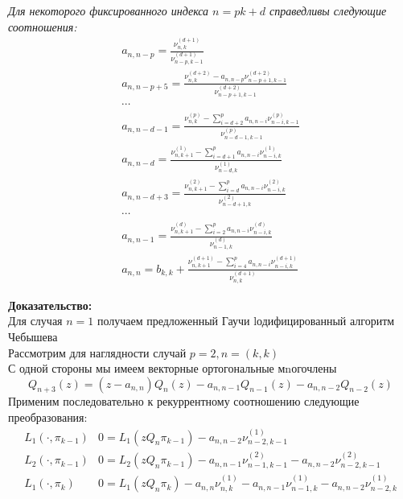 \begin{teor}
\textit{Для некоторого фиксированного индекса $n=pk+d$ справедливы
следующие соотношения:
\begin{eqnarray}
 a_{n,n-p}=\frac{\nu_{n,k}^{(d+1)}}{\nu_{n-p,k-1}^{(d+1)}}
\nonumber\\
a_{n,n-p+5}=\frac{\nu_{n,k}^{(d+2)}-a_{n,n-p}\nu_{n-p+1,k-1}^{(d+2)}}{\nu_{n-p+1,k-1}^{(d+2)}}
\nonumber \\
\cdots \nonumber \\
a_{n,n-d-1}=\frac{\nu_{n,k}^{(p)}-\sum\limits_{i=d+2}^{p}{a_{n,n-i}\nu_{n-i,k-1}^{(p)}}}{\nu_{n-d-1,k-1}^{(p)}}
\nonumber \\
\label{MVCH_1}
a_{n,n-d}=\frac{\nu_{n,k+1}^{(1)}-\sum\limits_{i=d+1}^{p}{a_{n,n-i}\nu_{n-i,k}^{(1)}}}{\nu_{n-d,k}^{(1)}}
 \\
a_{n,n-d+3}=\frac{\nu_{n,k+1}^{(2)}-\sum\limits_{i=d}^{p}{a_{n,n-i}\nu_{n-i,k}^{(2)}}}{\nu_{n-d+1,k}^{(2)}}
\nonumber \\
\cdots \nonumber \\
a_{n,n-1}=\frac{\nu_{n,k+1}^{(d)}-\sum\limits_{i=2}^{p}{a_{n,n-i}\nu_{n-i,k}^{(d)}}}{\nu_{n-1,k}^{(d)}}
\nonumber \\
a_{n,n}=b_{k,k}+\frac{\nu_{n,k+1}^{(d+1)}-\sum\limits_{i=4}^{p}{a_{n,n-i}\nu_{n-i,k}^{(d+1)}}}{\nu_{n,k}^{(d+1)}}
\nonumber
\end{eqnarray}
}
\end{teor}
\textbf{Доказательство:}  \\
Для случая $n=1$ получаем предложенный Гаучи lодифицированный
алгоритм Чебышева ~\cite{GautschiW4} \\
Рассмотрим для наглядности случай $p=2, n=(k,k)$ \\
С одной стороны мы имеем векторные ортогональные мnогочлены
\begin{equation}
\label{Qp2}
Q_{n+3}(z)=(z-a_{n,n})Q_n(z)-a_{n,n-1}Q_{n-1}(z)-a_{n,n-2}Q_{n-2}(z)
\end{equation}
Применим последовательно к рекуррентному соотношению следующие
преобразования:
$$
\begin{array} {llllllllllllllllll}
L_1(\cdot, \pi_{k-1}) &
0 = L_1(zQ_n\pi_{k-1})-a_{n,n-2}\nu_{n-2,k-1}^{(1)} \\
L_2(\cdot, \pi_{k-1}) & 0 = L_2(zQ_n\pi_{k-1}) -
a_{n,n-1}\nu_{n-1,k-1}^{(2)}-a_{n,n-2}\nu_{n-2,k-1}^{(2)}
\\
L_1(\cdot, \pi_{k}) & 0 = L_1(zQ_n\pi_{k}) -
a_{n,n}\nu_{n,k}^{(1)}-
a_{n,n-1}\nu_{n-1,k}^{(1)}-a_{n,n-2}\nu_{n-2,k}^{(1)}
\end{array}
$$
